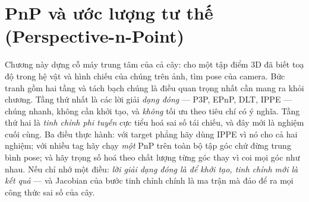 \documentclass[../../marker.tex]{subfiles}
\begin{document}
\chapter{PnP và ước lượng tư thế (Perspective-n-Point)}

\begin{tomtat}
Chương này dựng cỗ máy trung tâm của cả cây: cho một tập điểm 3D đã biết toạ độ trong hệ vật và hình chiếu của chúng trên ảnh, tìm pose của camera. Bức tranh gồm hai tầng và tách bạch chúng là điều quan trọng nhất cần mang ra khỏi chương. Tầng thứ nhất là các lời giải \emph{dạng đóng} --- P3P, EPnP, DLT, IPPE --- chúng nhanh, không cần khởi tạo, và \emph{không} tối ưu theo tiêu chí có ý nghĩa. Tầng thứ hai là \emph{tinh chỉnh phi tuyến} cực tiểu hoá sai số tái chiếu, và đây mới là nghiệm cuối cùng. Ba điều thực hành: với target phẳng hãy dùng IPPE vì nó cho cả hai nghiệm; với nhiều tag hãy chạy \emph{một} PnP trên toàn bộ tập góc chứ đừng trung bình pose; và hãy trọng số hoá theo chất lượng từng góc thay vì coi mọi góc như nhau. Nếu chỉ nhớ một điều: \emph{lời giải dạng đóng là để khởi tạo, tinh chỉnh mới là kết quả} --- và Jacobian của bước tinh chỉnh chính là ma trận mà  đảo để ra mọi công thức sai số của cây.
\end{tomtat}
\end{document}
